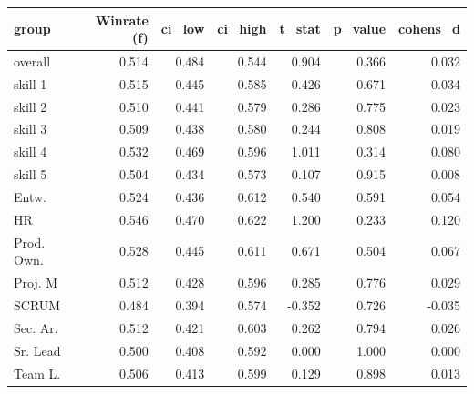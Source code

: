 \begin{tabular}{lrrrrrr}
\toprule
group & Winrate (f) & ci\_low & ci\_high & t\_stat & p\_value & cohens\_d \\
\midrule
overall & 0.514 & 0.484 & 0.544 & 0.904 & 0.366 & 0.032 \\
skill 1 & 0.515 & 0.445 & 0.585 & 0.426 & 0.671 & 0.034 \\
skill 2 & 0.510 & 0.441 & 0.579 & 0.286 & 0.775 & 0.023 \\
skill 3 & 0.509 & 0.438 & 0.580 & 0.244 & 0.808 & 0.019 \\
skill 4 & 0.532 & 0.469 & 0.596 & 1.011 & 0.314 & 0.080 \\
skill 5 & 0.504 & 0.434 & 0.573 & 0.107 & 0.915 & 0.008 \\
Entw. & 0.524 & 0.436 & 0.612 & 0.540 & 0.591 & 0.054 \\
HR & 0.546 & 0.470 & 0.622 & 1.200 & 0.233 & 0.120 \\
Prod. Own. & 0.528 & 0.445 & 0.611 & 0.671 & 0.504 & 0.067 \\
Proj. M & 0.512 & 0.428 & 0.596 & 0.285 & 0.776 & 0.029 \\
SCRUM & 0.484 & 0.394 & 0.574 & -0.352 & 0.726 & -0.035 \\
Sec. Ar. & 0.512 & 0.421 & 0.603 & 0.262 & 0.794 & 0.026 \\
Sr. Lead & 0.500 & 0.408 & 0.592 & 0.000 & 1.000 & 0.000 \\
Team L. & 0.506 & 0.413 & 0.599 & 0.129 & 0.898 & 0.013 \\
\bottomrule
\end{tabular}
